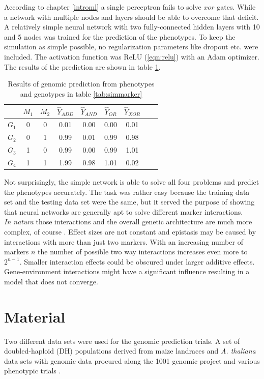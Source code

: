 According to chapter \ref{introml} a single perceptron fails to solve $xor$ gates. While a
network with multiple nodes and layers should be able to overcome that deficit. A
relatively simple neural network with two fully-connected hidden layers with 10 and 5
nodes was trained for the prediction of the phenotypes. To keep the simulation as simple
possible, no regularization parameters like dropout etc. were included. The activation
function was ReLU (\ref{eqn:relu}) with an Adam optimizer. The results of the prediction
are shown in table \ref{tab:simgpres}.

\begin{table}[H]
\caption{Results of genomic prediction from phenotypes and genotypes in table \ref{tab:simmarker}}
\label{tab:simgpres}
\centering
\begin{tabular}{ l c c | c c c c c c }
 \toprule
 & $M_1$ & $M_2$ & $\hat{Y}_{ADD}$ & $\hat{Y}_{AND}$ & $\hat{Y}_{OR}$ & $\hat{Y}_{XOR}$\\
 \midrule
 \hline 
 $G_1$ & 0 & 0 & 0.01 & 0.00 & 0.00 & 0.01 \\
 $G_2$ & 0 & 1 & 0.99 & 0.01 & 0.99 & 0.98 \\
 $G_3$ & 1 & 0 & 0.99 & 0.00 & 0.99 & 1.01 \\
 $G_4$ & 1 & 1 & 1.99 & 0.98 & 1.01 & 0.02 \\
 \bottomrule
\end{tabular}
\end{table}


Not surprisingly, the simple network is able to solve all four problems and predict the
phenotypes accurately. The task was rather easy because the training data set and the
testing data set were the same, but it served the purpose of showing that neural networks
are generally apt to solve different marker interactions. \\
\textit{In natura} those interactions and the overall genetic architecture are much more
complex, of course . Effect sizes are not constant and epistasis may be caused by
interactions with more than just two markers. With an increasing number of markers $n$ the
number of possible two way interactions increases even more to $2^{n-1}$. Smaller
interaction effects could be obscured under larger additive effects. Gene-environment
interactions might have a significant influence resulting in a model that does not
converge.

\section{Material}
Two different data sets were used for the genomic prediction trials. A set of
doubled-haploid (DH) populations derived from maize landraces and \textit{A. thaliana}
data sets with genomic data procured along the 1001 genomic project \cite{1001genome} and
various phenotypic trials \cite{seren2016arapheno}.


